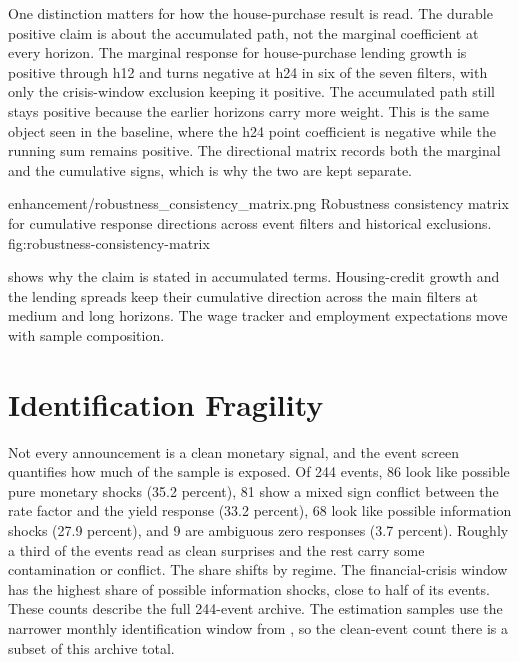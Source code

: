 One distinction matters for how the house-purchase result is read. The durable positive claim is about the accumulated path, not the marginal coefficient at every horizon. The marginal response for house-purchase lending growth is positive through h12 and turns negative at h24 in six of the seven filters, with only the crisis-window exclusion keeping it positive. The accumulated path still stays positive because the earlier horizons carry more weight. This is the same object seen in the baseline, where the h24 point coefficient is negative while the running sum remains positive. The directional matrix records both the marginal and the cumulative signs, which is why the two are kept separate.

\thesisfigure
  {enhancement/robustness_consistency_matrix.png}
  {Robustness consistency matrix for cumulative response directions across event filters and historical exclusions.}
  {fig:robustness-consistency-matrix}

 shows why the claim is stated in accumulated terms. Housing-credit growth and the lending spreads keep their cumulative direction across the main filters at medium and long horizons. The wage tracker and employment expectations move with sample composition.

\section{Identification Fragility}

Not every announcement is a clean monetary signal, and the event screen quantifies how much of the sample is exposed. Of 244 events, 86 look like possible pure monetary shocks (35.2 percent), 81 show a mixed sign conflict between the rate factor and the yield response (33.2 percent), 68 look like possible information shocks (27.9 percent), and 9 are ambiguous zero responses (3.7 percent). Roughly a third of the events read as clean surprises and the rest carry some contamination or conflict. The share shifts by regime. The financial-crisis window has the highest share of possible information shocks, close to half of its events. These counts describe the full 244-event archive. The estimation samples use the narrower monthly identification window from , so the clean-event count there is a subset of this archive total.



